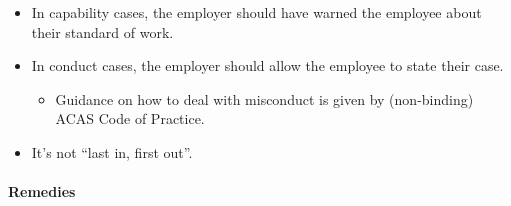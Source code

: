 \documentclass[
]{article}
\providecommand{\tightlist}{%
  \setlength{\itemsep}{0pt}\setlength{\parskip}{0pt}}
\begin{document}
\begin{itemize}
  \begin{itemize}
  \tightlist
  \item
    In capability cases, the employer should have warned the employee
    about their standard of work.
  \item
    In conduct cases, the employer should allow the employee to state
    their case.

    \begin{itemize}
    \tightlist
    \item
      Guidance on how to deal with misconduct is given by (non-binding)
      ACAS Code of Practice.
    \end{itemize}
  \item
    It's not ``last in, first out''.
  \end{itemize}
\end{itemize}

\hypertarget{remedies}{%
\paragraph{Remedies}\label{remedies}}
\end{document}

